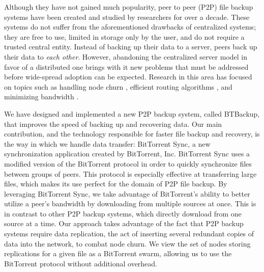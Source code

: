 \documentclass[12pt]{report}
\begin{document}
Although they have not gained much popularity, peer to peer (P2P) file backup systems have been created and studied by researchers for over a decade. These systems do not suffer from the aforementioned drawbacks of centralized systems; they are free to use, limited in storage only by the user, and do not require a trusted central entity. Instead of backing up their data to a server, peers back up their data to \textit{each other}. However, abandoning the centralized server model in favor of a distributed one brings with it new problems that must be addressed before wide-spread adoption can be expected. Research in this area has focused on topics such as handling node churn \cite{ChurnResilient}, efficient routing algorithms \cite{Kademlia}, and minimizing bandwidth \cite{PeerStore}.

We have designed and implemented a new P2P backup system, called \mbox{BTBackup}, that improves the speed of backing up and recovering data. Our main contribution, and the technology responsible for faster file backup and recovery, is the way in which we handle data transfer: BitTorrent Sync, a new synchronization application created by BitTorrent, Inc. BitTorrent Sync uses a modified version of the BitTorrent protocol \cite{BTSyncFAQ} in order to quickly synchronize files between groups of peers. This protocol is especially effective at transferring large files, which makes its use perfect for the domain of P2P file backup. By leveraging BitTorrent Sync, we take advantage of BitTorrent's ability to better utilize a peer's bandwidth by downloading from multiple sources at once. This is in contrast to other P2P backup systems, which directly download from one source at a time. Our approach takes advantage of the fact that P2P backup systems require data replication, the act of inserting several redundant copies of data into the network, to combat node churn. We view the set of nodes storing replications for a given file as a BitTorrent swarm, allowing us to use the BitTorrent protocol without additional overhead.
\end{document}
